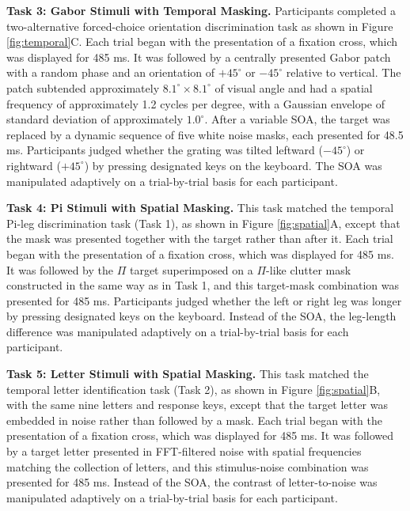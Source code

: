 \documentclass[
  ,man]{apa6}
\begin{document}
\textbf{Task 3: Gabor Stimuli with Temporal Masking.} Participants completed a two-alternative forced-choice orientation discrimination task as shown in Figure \ref{fig:temporal}C. Each trial began with the presentation of a fixation cross, which was displayed for 485 ms. It was followed by a centrally presented Gabor patch with a random phase and an orientation of \(+45^\circ\) or \(-45^\circ\) relative to vertical. The patch subtended approximately \(8.1^\circ \times 8.1^\circ\) of visual angle and had a spatial frequency of approximately 1.2 cycles per degree, with a Gaussian envelope of standard deviation of approximately \(1.0^\circ\). After a variable SOA, the target was replaced by a dynamic sequence of five white noise masks, each presented for 48.5 ms. Participants judged whether the grating was tilted leftward (\(-45^\circ\)) or rightward (\(+45^\circ\)) by pressing designated keys on the keyboard. The SOA was manipulated adaptively on a trial-by-trial basis for each participant.

\textbf{Task 4: Pi Stimuli with Spatial Masking.} This task matched the temporal Pi-leg discrimination task (Task 1), as shown in Figure \ref{fig:spatial}A, except that the mask was presented together with the target rather than after it. Each trial began with the presentation of a fixation cross, which was displayed for 485 ms. It was followed by the \(\Pi\) target superimposed on a \(\Pi\)-like clutter mask constructed in the same way as in Task 1, and this target-mask combination was presented for 485 ms. Participants judged whether the left or right leg was longer by pressing designated keys on the keyboard. Instead of the SOA, the leg-length difference was manipulated adaptively on a trial-by-trial basis for each participant.

\textbf{Task 5: Letter Stimuli with Spatial Masking.} This task matched the temporal letter identification task (Task 2), as shown in Figure \ref{fig:spatial}B, with the same nine letters and response keys, except that the target letter was embedded in noise rather than followed by a mask. Each trial began with the presentation of a fixation cross, which was displayed for 485 ms. It was followed by a target letter presented in FFT-filtered noise with spatial frequencies matching the collection of letters, and this stimulus-noise combination was presented for 485 ms. Instead of the SOA, the contrast of letter-to-noise was manipulated adaptively on a trial-by-trial basis for each participant.
\end{document}
